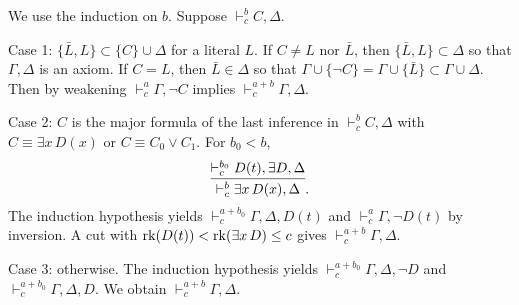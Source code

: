 \documentclass{../../../small}
\begin{document}
\begin{pf}
We use the induction on $b$.
Suppose $\vdash_c^bC,\Delta$.

Case 1: $\{\bar L,L\}\subset\{C\}\cup\Delta$ for a literal $L$.
If $C\ne L$ nor $\bar L$, then $\{\bar L,L\}\subset\Delta$ so that $\Gamma,\Delta$ is an axiom.
If $C=L$, then $\bar L\in\Delta$ so that $\Gamma\cup\{\neg C\}=\Gamma\cup\{\bar L\}\subset\Gamma\cup\Delta$.
Then by weakening $\vdash_c^a\Gamma,\neg C$ implies $\vdash_c^{a+b}\Gamma,\Delta$.

Case 2: $C$ is the major formula of the last inference in $\vdash_c^bC,\Delta$ with $C\equiv\exists x\,D(x)$ or $C\equiv C_0\vee C_1$.
For $b_0<b$,
\[\infer{\vdash_c^b\exists x\,D(x),\Delta}{\vdash_c^{b_0}D(t),\exists D,\Delta}.\]
The induction hypothesis yields $\vdash_c^{a+b_0}\Gamma,\Delta,D(t)$ and $\vdash_c^a\Gamma,\neg D(t)$ by inversion.
A cut with $\operatorname{rk}(D(t))<\operatorname{rk}(\exists x\,D)\le c$ gives $\vdash_c^{a+b}\Gamma,\Delta$.

Case 3: otherwise.
The induction hypothesis yields $\vdash_c^{a+b_0}\Gamma,\Delta,\neg D$ and $\vdash_c^{a+b_0}\Gamma,\Delta,D$.
We obtain $\vdash_c^{a+b}\Gamma,\Delta$.

\end{pf}
\end{document}
